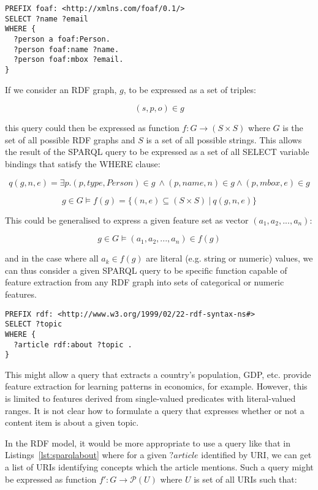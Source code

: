 \documentclass[10pt,a4paper]{report}
\begin{document}
\begin{lstlisting}[label=lst:sparqlfoaf,caption={Example SPARQL query for people's names and email addresses},language=sparql]
PREFIX foaf: <http://xmlns.com/foaf/0.1/>
SELECT ?name ?email
WHERE {
  ?person a foaf:Person.
  ?person foaf:name ?name.
  ?person foaf:mbox ?email.
}
\end{lstlisting}

If we consider an RDF graph, $g$, to be expressed as a set of triples:

\begin{displaymath}
  (s, p, o) \in g
\end{displaymath}

\noindent this query could then be
expressed as function $f: G \rightarrow (S \times S)$ where $G$ is the set of
all possible RDF graphs and $S$ is a set of all possible strings.
This allows the result of the
SPARQL query to be expressed as a set of all SELECT variable bindings that
satisfy the WHERE clause:

$$
q(g,n,e) = \exists p . (p, type, Person) \in g\ \land (p, name, n) \in g \land (p, mbox, e) \in g
$$

$$
g \in G \models f(g) = \{(n, e) \subseteq (S \times S) \: | \: q(g,n,e)\}
$$

This could be generalised to express a given feature set as
vector $(a_1, a_2, ..., a_n)$:

$$
g \in G \models (a_1, a_2, ..., a_n) \in f(g)
$$

\noindent and in the case where all $a_k \in f(g)$ are literal (e.g. string or
numeric) values, we can thus consider a given SPARQL query to be specific
function capable of feature extraction from any RDF graph into sets of
categorical or numeric features.

\begin{lstlisting}[label=lst:sparqlabout,caption={SPARQL query to determine what },language=sparql]
PREFIX rdf: <http://www.w3.org/1999/02/22-rdf-syntax-ns#>
SELECT ?topic
WHERE {
  ?article rdf:about ?topic .
}
\end{lstlisting}

This might allow a query that extracts a country's population, GDP, etc.
provide feature extraction for learning patterns in economics, for example.
However, this is limited to features derived from single-valued predicates
with literal-valued ranges. It is not clear how to formulate a query that
expresses whether or not a content item is about a given topic.

In the RDF
model, it would be more appropriate to use a query like that in
Listings~\ref{lst:sparqlabout} where for a given $?article$ identified by
URI, we can get a list of URIs identifying concepts which the article mentions.
Such a query might be expressed as function $f': G \rightarrow \mathcal P(U)$ where $U$ is
set of all URIs such that:
\end{document}

